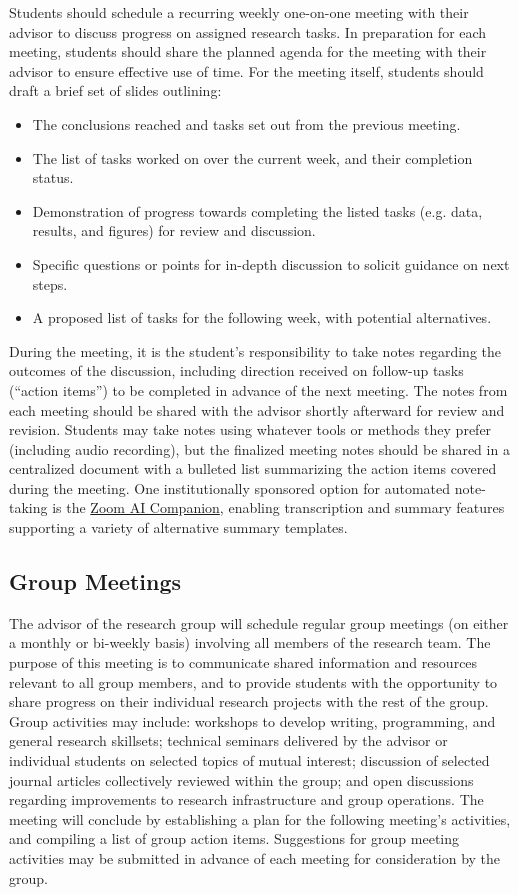 \documentclass[12pt,a4paper,article,oneside]{memoir} %
\begin{document}
Students should schedule a recurring weekly one-on-one meeting with their advisor to discuss progress on assigned research tasks. In preparation for each meeting, students should share the planned agenda for the meeting with their advisor to ensure effective use of time. For the meeting itself, students should draft a brief set of slides outlining:
\begin{itemize}
\item The conclusions reached and tasks set out from the previous meeting.
\item The list of tasks worked on over the current week, and their completion status.
\item Demonstration of progress towards completing the listed tasks (e.g. data, results, and figures) for review and discussion.
\item Specific questions or points for in-depth discussion to solicit guidance on next steps.
\item A proposed list of tasks for the following week, with potential alternatives.
\end{itemize}

During the meeting, it is the student's responsibility to take notes regarding the outcomes of the discussion, including direction received on follow-up tasks (``action items'') to be completed in advance of the next meeting. The notes from each meeting should be shared with the advisor shortly afterward for review and revision. Students may take notes using whatever tools or methods they prefer (including audio recording), but the finalized meeting notes should be shared in a centralized document with a bulleted list summarizing the action items covered during the meeting. One institutionally sponsored option for automated note-taking is the \href{https://spotlight.okstate.edu/dasnrit/2024/10/23/zoom-ai-companion/}{Zoom AI Companion}, enabling transcription and summary features supporting a variety of alternative summary templates.

\subsection{Group Meetings}

The advisor of the research group will schedule regular group meetings (on either a monthly or bi-weekly basis) involving all members of the research team. The purpose of this meeting is to communicate shared information and resources relevant to all group members, and to provide students with the opportunity to share progress on their individual research projects with the rest of the group. Group activities may include: workshops to develop writing, programming, and general research skillsets; technical seminars delivered by the advisor or individual students on selected topics of mutual interest; discussion of selected journal articles collectively reviewed within the group; and open discussions regarding improvements to research infrastructure and group operations. The meeting will conclude by establishing a plan for the following meeting's activities, and compiling a list of group action items. Suggestions for group meeting activities may be submitted in advance of each meeting for consideration by the group.
\end{document}
